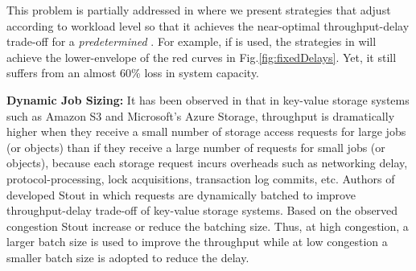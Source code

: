 \documentclass[journal]{IEEEtran}
\begin{document}
This problem is partially addressed in \cite{fastcloud} where we present strategies that adjust  according to workload level so that it achieves the near-optimal throughput-delay trade-off for a {\em predetermined} . For example, if  is used, the strategies in \cite{fastcloud} will achieve the lower-envelope of the red curves in Fig.\ref{fig:fixedDelays}. Yet, it still suffers from an almost 60\% loss in system capacity.


{\bf Dynamic Job Sizing:}
It has been observed in \cite{Garfinkel07anevaluation, stout} that in key-value storage systems such as Amazon S3 and Microsoft's Azure Storage, throughput is dramatically higher when they receive a small number of storage access requests for large jobs (or objects) than if they receive a large number of requests for small jobs (or objects), because each storage request incurs overheads such as networking delay, protocol-processing, lock acquisitions, transaction log commits, etc. Authors of \cite{stout} developed Stout in which requests are dynamically batched to improve throughput-delay trade-off of key-value storage systems. Based on the observed congestion Stout increase or reduce the batching size. Thus, at high congestion, a larger batch size is used to improve the throughput while at low congestion a smaller batch size is adopted to reduce the delay.
\end{document}
